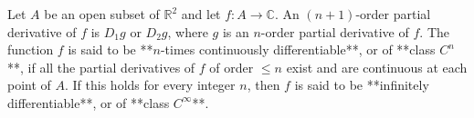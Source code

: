 Let $A$ be an open subset of $\mathbb{R}^2$ and let $f: A \to \mathbb{C}$. An $(n+1)$-order partial derivative of $f$ is $D_1 g$ or $D_2 g$, where $g$ is an $n$-order partial derivative of $f$. The function $f$ is said to be **$n$-times continuously differentiable**, or of **class $C^n$**, if all the partial derivatives of $f$ of order $\leq n$ exist and are continuous at each point of $A$. If this holds for every integer $n$, then $f$ is said to be **infinitely differentiable**, or of **class $C^\infty$**.
